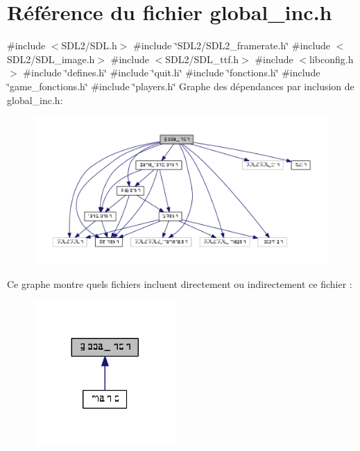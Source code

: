 \section{Référence du fichier global\+\_\+inc.\+h}
\label{global__inc_8h}
{\ttfamily \#include $<$S\+D\+L2/\+S\+D\+L.\+h$>$}\newline
{\ttfamily \#include \char`\"{}S\+D\+L2/\+S\+D\+L2\+\_\+framerate.\+h\char`\"{}}\newline
{\ttfamily \#include $<$S\+D\+L2/\+S\+D\+L\+\_\+image.\+h$>$}\newline
{\ttfamily \#include $<$S\+D\+L2/\+S\+D\+L\+\_\+ttf.\+h$>$}\newline
{\ttfamily \#include $<$libconfig.\+h$>$}\newline
{\ttfamily \#include \char`\"{}defines.\+h\char`\"{}}\newline
{\ttfamily \#include \char`\"{}quit.\+h\char`\"{}}\newline
{\ttfamily \#include \char`\"{}fonctions.\+h\char`\"{}}\newline
{\ttfamily \#include \char`\"{}game\+\_\+fonctions.\+h\char`\"{}}\newline
{\ttfamily \#include \char`\"{}players.\+h\char`\"{}}\newline
Graphe des dépendances par inclusion de global\+\_\+inc.\+h\+:
\nopagebreak
\begin{figure}[H]
\begin{center}
\leavevmode
\includegraphics[width=350pt]{global__inc_8h__incl}
\end{center}
\end{figure}
Ce graphe montre quels fichiers incluent directement ou indirectement ce fichier \+:
\nopagebreak
\begin{figure}[H]
\begin{center}
\leavevmode
\includegraphics[width=152pt]{global__inc_8h__dep__incl}
\end{center}
\end{figure}



